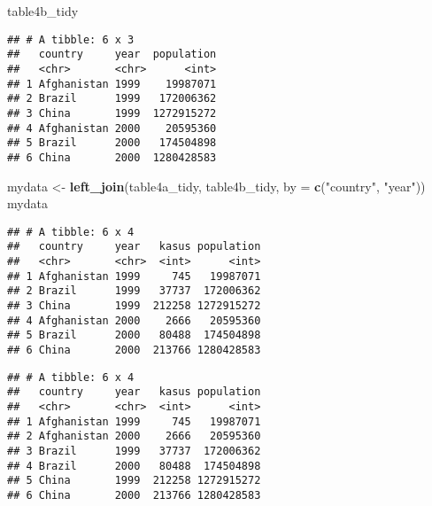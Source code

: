 \documentclass[]{article}
\newenvironment{Shaded}{\begin{snugshade}}{\end{snugshade}}
\newcommand{\CommentTok}[1]{\textcolor[rgb]{0.56,0.35,0.01}{\textit{#1}}}
\newcommand{\DataTypeTok}[1]{\textcolor[rgb]{0.13,0.29,0.53}{#1}}
\newcommand{\KeywordTok}[1]{\textcolor[rgb]{0.13,0.29,0.53}{\textbf{#1}}}
\newcommand{\NormalTok}[1]{#1}
\newcommand{\OperatorTok}[1]{\textcolor[rgb]{0.81,0.36,0.00}{\textbf{#1}}}
\newcommand{\StringTok}[1]{\textcolor[rgb]{0.31,0.60,0.02}{#1}}
\begin{document}
\begin{Shaded}
\begin{Highlighting}[]
\NormalTok{table4b_tidy}
\end{Highlighting}
\end{Shaded}

\begin{verbatim}
## # A tibble: 6 x 3
##   country     year  population
##   <chr>       <chr>      <int>
## 1 Afghanistan 1999    19987071
## 2 Brazil      1999   172006362
## 3 China       1999  1272915272
## 4 Afghanistan 2000    20595360
## 5 Brazil      2000   174504898
## 6 China       2000  1280428583
\end{verbatim}

\begin{Shaded}
\begin{Highlighting}[]
\NormalTok{mydata <-}\StringTok{ }\KeywordTok{left_join}\NormalTok{(table4a_tidy, table4b_tidy, }\DataTypeTok{by =} \KeywordTok{c}\NormalTok{(}\StringTok{"country"}\NormalTok{, }\StringTok{"year"}\NormalTok{))}
\NormalTok{mydata}
\end{Highlighting}
\end{Shaded}

\begin{verbatim}
## # A tibble: 6 x 4
##   country     year   kasus population
##   <chr>       <chr>  <int>      <int>
## 1 Afghanistan 1999     745   19987071
## 2 Brazil      1999   37737  172006362
## 3 China       1999  212258 1272915272
## 4 Afghanistan 2000    2666   20595360
## 5 Brazil      2000   80488  174504898
## 6 China       2000  213766 1280428583
\end{verbatim}

\begin{Shaded}
\end{Shaded}

\begin{verbatim}
## # A tibble: 6 x 4
##   country     year   kasus population
##   <chr>       <chr>  <int>      <int>
## 1 Afghanistan 1999     745   19987071
## 2 Afghanistan 2000    2666   20595360
## 3 Brazil      1999   37737  172006362
## 4 Brazil      2000   80488  174504898
## 5 China       1999  212258 1272915272
## 6 China       2000  213766 1280428583
\end{verbatim}
\end{document}
